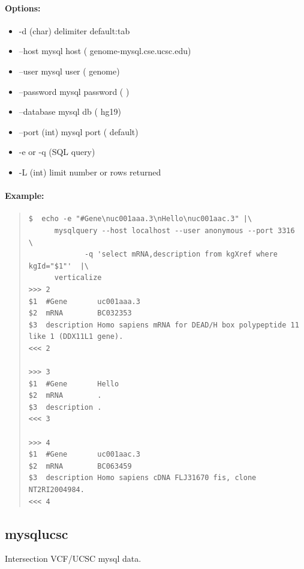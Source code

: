 \documentclass[12pt]{article}
\begin{document}
\paragraph{Options:}
\begin{itemize}
\item-d (char) delimiter default:tab
\item--host mysql host ( genome-mysql.cse.ucsc.edu)
\item--user mysql user ( genome)
\item--password mysql password ( )
\item--database mysql db ( hg19)
\item--port (int) mysql port ( default)
\item-e or -q (SQL query)
\item-L (int) limit number or rows returned
\end{itemize}
\paragraph{Example:}

\begin{quote}
\begin{verbatim}
$  echo -e "#Gene\nuc001aaa.3\nHello\nuc001aac.3" |\
      mysqlquery --host localhost --user anonymous --port 3316  \
             -q 'select mRNA,description from kgXref where kgId="$1"'  |\
      verticalize 
>>>	2
$1	#Gene      	uc001aaa.3
$2	mRNA       	BC032353
$3	description	Homo sapiens mRNA for DEAD/H box polypeptide 11 like 1 (DDX11L1 gene).
<<<	2

>>>	3
$1	#Gene      	Hello
$2	mRNA       	.
$3	description	.
<<<	3

>>>	4
$1	#Gene      	uc001aac.3
$2	mRNA       	BC063459
$3	description	Homo sapiens cDNA FLJ31670 fis, clone NT2RI2004984.
<<<	4
\end{verbatim}
\end{quote}

\subsection{mysqlucsc}
Intersection VCF/UCSC mysql data.
\end{document}
